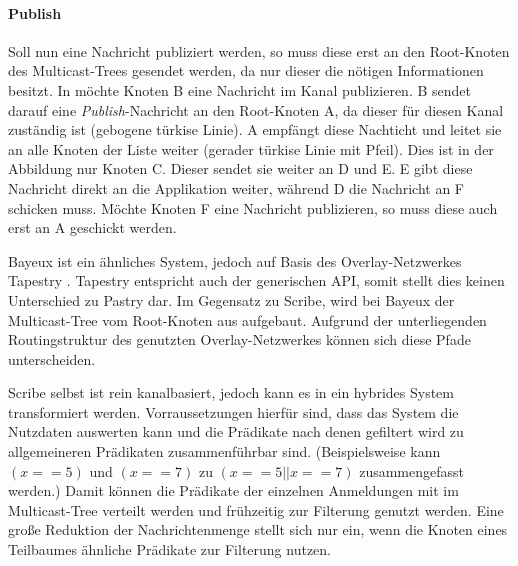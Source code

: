 \paragraph{Publish}
Soll nun eine Nachricht publiziert werden, so muss diese erst an den Root-Knoten des Multicast-Trees gesendet werden, da nur dieser die nötigen Informationen besitzt. In  möchte Knoten B eine Nachricht im Kanal publizieren. B sendet darauf eine \emph{Publish}-Nachricht an den Root-Knoten A, da dieser für diesen Kanal zuständig ist (gebogene türkise Linie). A empfängt diese Nachticht und leitet sie an alle Knoten der Liste weiter (gerader türkise Linie mit Pfeil). Dies ist in der Abbildung nur Knoten C. Dieser sendet sie weiter an D und E. E gibt diese Nachricht direkt an die Applikation weiter, während D die Nachricht an F schicken muss. Möchte Knoten F eine Nachricht publizieren, so muss diese auch erst an A geschickt werden.

Bayeux \cite{Zhuang2001} ist ein ähnliches System, jedoch auf Basis des Overlay-Netzwerkes Tapestry \cite{Zhao2004Tapestry}. Tapestry entspricht auch der generischen API, somit stellt dies keinen Unterschied zu Pastry dar. Im Gegensatz zu Scribe, wird bei Bayeux der Multicast-Tree vom Root-Knoten aus aufgebaut. Aufgrund der unterliegenden Routingstruktur des genutzten Overlay-Netzwerkes können sich diese Pfade unterscheiden.

Scribe selbst ist rein kanalbasiert, jedoch kann es in ein hybrides System transformiert werden. Vorraussetzungen hierfür sind, dass das System die Nutzdaten auswerten kann und die Prädikate nach denen gefiltert wird zu allgemeineren Prädikaten zusammenführbar sind. (Beispielsweise kann $(x == 5)$ und $(x == 7)$ zu $(x == 5 || x == 7)$ zusammengefasst werden.) Damit können die Prädikate der einzelnen Anmeldungen mit im Multicast-Tree verteilt werden und frühzeitig zur Filterung genutzt werden. Eine große Reduktion der Nachrichtenmenge stellt sich nur ein, wenn die Knoten eines Teilbaumes ähnliche Prädikate zur Filterung nutzen.
